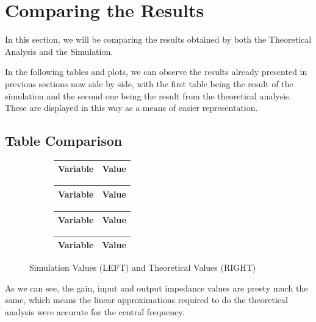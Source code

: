 \clearpage

\section{Comparing the Results}
\label{sec:comparing}

In this section, we will be comparing the results obtained by both the Theoretical Analysis and the Simulation.

In the following tables and plots, we can observe the results already presented in previous sections now side by side, with the first table being the result of the simulation and the second one being the result from the theoretical analysis. These are displayed in this
way as a means of easier representation.

\subsection{Table Comparison}


\begin{figure}[H]
\centering
\begin{subfigure}{.5\textwidth}
  \centering
  \begin{tabular}{|l|r|}
  \hline    
  {\bf Variable} & {\bf Value} \\ \hline
  
  \end{tabular}
  \begin{tabular}{|l|r|}
  \hline    
  {\bf Variable} & {\bf Value} \\ \hline
  
 \end{tabular}
 \begin{tabular}{|l|r|}
  \hline    
  {\bf Variable} & {\bf Value} \\ \hline
  
  \hline
  \end{tabular}
\end{subfigure}%
\begin{subfigure}{.4\textwidth}
  \centering
  \begin{tabular}{|l|r|}
  \hline    
  {\bf Variable} & {\bf Value} \\ \hline
  
  \end{tabular}
\end{subfigure}
\caption{Simulation Values (LEFT) and Theoretical Values (RIGHT)}
\label{fig:sbs1}
\end{figure}

As we can see, the gain, input and output impedance values are preety much the same, which means the linear approximations required to do the theoretical analysis were accurate for the central frequency.

